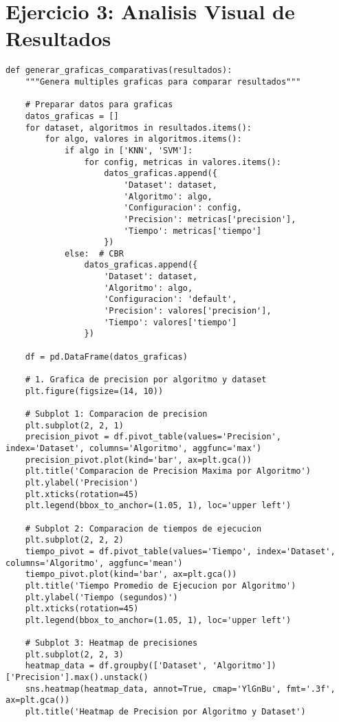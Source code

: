 \documentclass[12pt]{article}
\begin{document}
\section{Ejercicio 3: Analisis Visual de Resultados}

\begin{lstlisting}
def generar_graficas_comparativas(resultados):
    """Genera multiples graficas para comparar resultados"""
    
    # Preparar datos para graficas
    datos_graficas = []
    for dataset, algoritmos in resultados.items():
        for algo, valores in algoritmos.items():
            if algo in ['KNN', 'SVM']:
                for config, metricas in valores.items():
                    datos_graficas.append({
                        'Dataset': dataset,
                        'Algoritmo': algo,
                        'Configuracion': config,
                        'Precision': metricas['precision'],
                        'Tiempo': metricas['tiempo']
                    })
            else:  # CBR
                datos_graficas.append({
                    'Dataset': dataset,
                    'Algoritmo': algo,
                    'Configuracion': 'default',
                    'Precision': valores['precision'],
                    'Tiempo': valores['tiempo']
                })
    
    df = pd.DataFrame(datos_graficas)
    
    # 1. Grafica de precision por algoritmo y dataset
    plt.figure(figsize=(14, 10))
    
    # Subplot 1: Comparacion de precision
    plt.subplot(2, 2, 1)
    precision_pivot = df.pivot_table(values='Precision', index='Dataset', columns='Algoritmo', aggfunc='max')
    precision_pivot.plot(kind='bar', ax=plt.gca())
    plt.title('Comparacion de Precision Maxima por Algoritmo')
    plt.ylabel('Precision')
    plt.xticks(rotation=45)
    plt.legend(bbox_to_anchor=(1.05, 1), loc='upper left')
    
    # Subplot 2: Comparacion de tiempos de ejecucion
    plt.subplot(2, 2, 2)
    tiempo_pivot = df.pivot_table(values='Tiempo', index='Dataset', columns='Algoritmo', aggfunc='mean')
    tiempo_pivot.plot(kind='bar', ax=plt.gca())
    plt.title('Tiempo Promedio de Ejecucion por Algoritmo')
    plt.ylabel('Tiempo (segundos)')
    plt.xticks(rotation=45)
    plt.legend(bbox_to_anchor=(1.05, 1), loc='upper left')
    
    # Subplot 3: Heatmap de precisiones
    plt.subplot(2, 2, 3)
    heatmap_data = df.groupby(['Dataset', 'Algoritmo'])['Precision'].max().unstack()
    sns.heatmap(heatmap_data, annot=True, cmap='YlGnBu', fmt='.3f', ax=plt.gca())
    plt.title('Heatmap de Precision por Algoritmo y Dataset')
    

\end{lstlisting}
\end{document}
